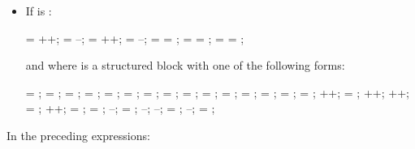 \begin{ccppspecific}
\begin{itemize}
\item If  is :
\begin{ompSyntax}
 = ++;
 = --;
 = ++;
 = --;
 =  = ;
 =  =   ;
 =  =   ;
\end{ompSyntax}

and where  is a structured block with one of the following forms:

\begin{ompSyntax}
{  = ;  = ; }
{  = ;  = ; }
{  = ;  =   ; }
{  = ;  =   ; }
{  =   ;  = ; }
{  =   ;  = ; }
{  = ;  = ; }
{  = ; ++; }
{  = ; ++; }
{ ++;  = ; }
{ ++;  = ; }
{  = ; --; }
{  = ; --; }
{ --;  = ; }
{ --;  = ; }
\end{ompSyntax}
\end{itemize}

In the preceding expressions:


\end{ccppspecific}
